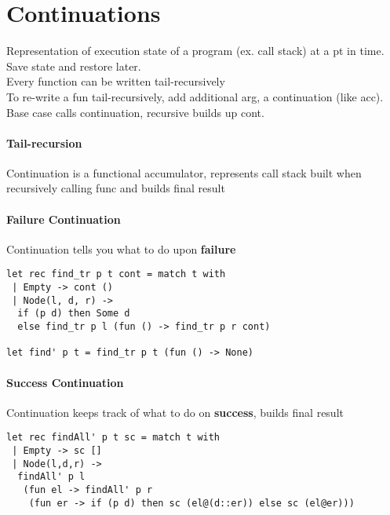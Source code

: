 \section{Continuations}
Representation of execution state of a program (ex. call stack) at a
pt in time. Save state and restore later.
\\ Every function can be written tail-recursively
\\ To re-write a fun tail-recursively, add additional arg, a
continuation (like acc). Base case calls continuation, recursive
builds up cont.
\vspace{-1 em}
\paragraph{Tail-recursion} Continuation is a functional accumulator,
represents call stack built when recursively calling func and builds
final result
\vspace{-1 em}
\paragraph{Failure Continuation} Continuation tells you what to do
upon \textbf{failure}
\begin{lstlisting}
let rec find_tr p t cont = match t with 
 | Empty -> cont ()
 | Node(l, d, r) -> 
  if (p d) then Some d
  else find_tr p l (fun () -> find_tr p r cont)

let find' p t = find_tr p t (fun () -> None)
\end{lstlisting}
\vspace{-1 em}
\paragraph{Success Continuation} Continuation keeps track of what to
do on \textbf{success}, builds final result
\begin{lstlisting}
let rec findAll' p t sc = match t with 
 | Empty -> sc []
 | Node(l,d,r) -> 
  findAll' p l 
   (fun el -> findAll' p r 
    (fun er -> if (p d) then sc (el@(d::er)) else sc (el@er)))
\end{lstlisting}
\color{Green}
